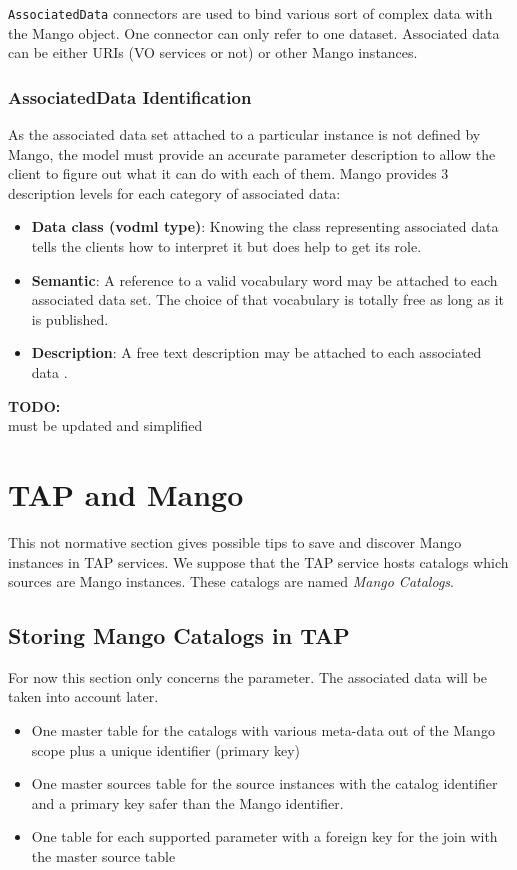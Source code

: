 \documentclass[11pt,a4paper]{ivoa}
\newcommand{\TODO}[1]{%
    \noindent%
    \colorbox{todocolor}{%
            \parbox{0.85\linewidth}{\sffamily \textbf{TODO:}\\
            #1}
    }%
    \vspace{2pt}

}
\begin{document}
\texttt{AssociatedData} connectors are used to bind various sort of complex data with the Mango object.
One connector can only refer to one dataset.
Associated data can be either URIs (VO services or not) or other Mango instances.

\subsubsection{AssociatedData Identification}
As the associated data set  attached to a particular instance is not defined by Mango,
the model must provide an accurate parameter description to allow the client to figure out what it can do with each of them.
Mango provides 3 description levels for each category of associated data:

\begin{itemize}
    \item \textbf{Data class (vodml type)}: Knowing the class representing associated data
          tells the clients  how to interpret it but does help to get its role.
    \item \textbf{Semantic}: A reference to  a valid vocabulary word may be attached to
          each associated data set.
          The choice of that vocabulary is totally free as long as it is published.
    \item \textbf{Description}: A free text description may be attached to each associated data .
\end{itemize}




\TODO{must be updated and simplified}
\section{TAP and Mango}
This not normative section gives possible tips to save and discover Mango instances in TAP services.
We suppose that the TAP service hosts catalogs which sources are Mango instances. These catalogs are named \emph{Mango Catalogs}.

\subsection{Storing Mango Catalogs in TAP}
For now this section only concerns the parameter. The associated data will be taken into account later.

\begin{itemize}
  \item One master table for the catalogs with various meta-data out of the Mango scope plus a unique identifier (primary key)
  \item One master sources table for the source instances with the catalog identifier and a primary key safer than the Mango identifier.
  \item One table for each supported parameter with a foreign key for the join with the master source table
\end{itemize}
\end{document}
